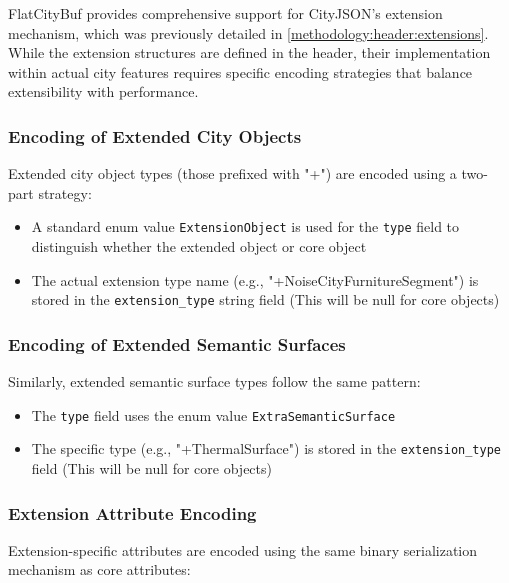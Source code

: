 FlatCityBuf provides comprehensive support for CityJSON's extension mechanism, which was previously detailed in \autoref{methodology:header:extensions}. While the extension structures are defined in the header, their implementation within actual city features requires specific encoding strategies that balance extensibility with performance.

\subsubsection{Encoding of Extended City Objects}
\label{methodology:feature_encoding:extension_mechanism:city_objects}

Extended city object types (those prefixed with "+") are encoded using a two-part strategy:

\begin{itemize}
  \item A standard enum value \texttt{ExtensionObject} is used for the \texttt{type} field to distinguish whether the extended object or core object
  \item The actual extension type name (e.g., "+NoiseCityFurnitureSegment") is stored in the \texttt{extension\_type} string field (This will be null for core objects)
\end{itemize}

\subsubsection{Encoding of Extended Semantic Surfaces}
\label{methodology:feature_encoding:extension_mechanism:semantic_surfaces}

Similarly, extended semantic surface types follow the same pattern:

\begin{itemize}
  \item The \texttt{type} field uses the enum value \texttt{ExtraSemanticSurface}
  \item The specific type (e.g., "+ThermalSurface") is stored in the \texttt{extension\_type} field (This will be null for core objects)
\end{itemize}

\subsubsection{Extension Attribute Encoding}
\label{methodology:feature_encoding:extension_mechanism:attributes}

Extension-specific attributes are encoded using the same binary serialization mechanism as core attributes:

